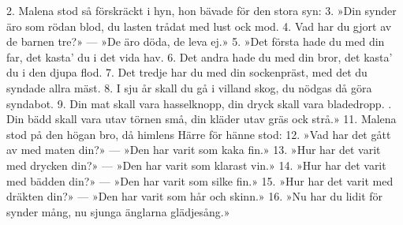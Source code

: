 \setlength{\columnsep}{0.5cm}
\begin{multicols}{2}
2.  Malena stod så förskräckt i hyn,
    hon bävade för den stora syn:
3.  »Din synder äro som rödan blod,
    du lasten trådat med lust ock mod.
4.  Vad har du gjort av de barnen tre?» —
    »De äro döda, de leva ej.»
5.  »Det första hade du med din far,
    det kasta’ du i det vida hav.
6.  Det andra hade du med din bror,
    det kasta’ du i den djupa flod.
7.  Det tredje har du med din sockenpräst,
    med det du syndade allra mäst.
8.  I sju år skall du gå i villand skog,
    du nödgas då göra syndabot.
9.  Din mat skall vara hasselknopp,
    din dryck skall vara bladedropp.
\vfill{}. Din bädd skall vara utav törnen små,
    din kläder utav gräs ock strå.»
11. Malena stod på den högan bro,
    då himlens Härre för hänne stod:
12. »Vad har det gått av med maten din?» —
    »Den har varit som kaka fin.»
13. »Hur har det varit med drycken din?» —
    »Den har varit som klarast vin.»
14. »Hur har det varit med bädden din?» —
    »Den har varit som silke fin.»
15. »Hur har det varit med dräkten din?» —
    »Den har varit som hår och skinn.»
16. »Nu har du lidit för synder mång,
    nu sjunga änglarna glädjesång.»
\end{multicols}
